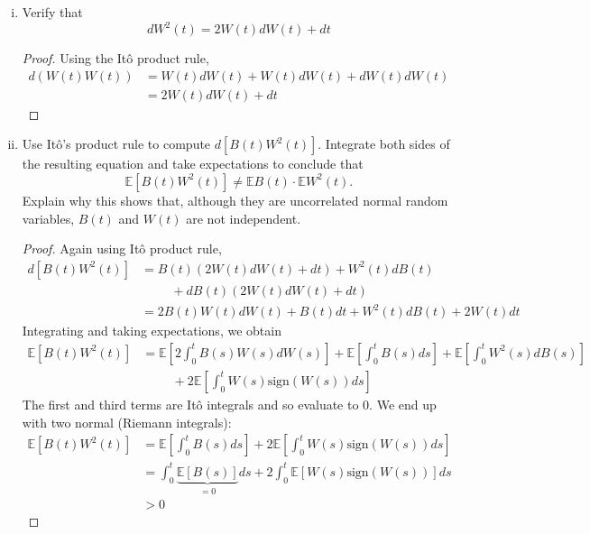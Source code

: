 \documentclass{article}
\newcommand{\E}{\mathbb{E}}
\newcommand{\sign}{\mathrm{sign}}
\theoremstyle{definition}
\theoremstyle{definition}
\begin{document}
\begin{enumerate}
\begin{enumerate}[(i)]
\begin{proof}
        Some notes on the above steps: we were able to set the It\^{0} integral to $0$, as noted, because It\^{o} integrals are martingales. In the final line, we were able to exchange the integral and the expectation using Fubini's theorem, since the integral is finite. 
            
        \end{proof}
        
        
        \item Verify that
        $$dW^2(t) = 2W(t)dW(t)+dt$$
        
        \begin{proof} Using the It\^{o} product rule,
        \begin{align*}
            d(W(t)W(t)) &= W(t)dW(t)+W(t)dW(t)+dW(t)dW(t) \\
            &= 2W(t)dW(t) +dt
        \end{align*}
        \end{proof}
        
        \item Use It\^{o}'s product rule to compute $d\left[ B(t)W^2(t)\right]$. Integrate both sides of the resulting equation and take expectations to conclude that 
        $$ \E[B(t)W^2(t)] \neq \E B(t) \cdot \E W^2(t).$$
        Explain why this shows that, although they are uncorrelated normal random variables, $B(t)$ and $W(t)$ are not independent.
        
        \begin{proof} Again using It\^{o} product rule,
        \begin{align*}
            d[B(t)W^2(t)] &= B(t) (2W(t)dW(t)+dt) + W^2(t)dB(t)\\
            &\hspace{1cm}+ dB(t)(2W(t)dW(t)+dt) \\
            &=2 B(t)W(t)dW(t) + B(t)dt + W^2(t)dB(t) + 2W(t)dt
        \end{align*}
        Integrating and taking expectations, we obtain
        \begin{align*}
            \E[B(t)W^2(t)] &= \E\left[2 \int_0^t B(s)W(s)dW(s) \right] + \E\left[\int_0^t B(s) ds \right] + \E\left[\int_0^t W^2(s)dB(s) \right] \\
            &\hspace{1cm}+ 2\E\left[ \int_0^t W(s)\sign(W(s))ds \right]
        \end{align*}
        The first and third terms are It\^{o} integrals and so evaluate to $0$. We end up with two normal (Riemann integrals):
        \begin{align*}
            \E[B(t)W^2(t)] &= \E\left[\int_0^t B(s)ds \right]+ 2\E\left[\int_0^t W(s)\sign(W(s))ds \right] \\
            &= \int_0^t \underset{=0}{\underbrace{\E\left[B(s)\right]}}ds + 2\int_0^t \E\left[W(s)\sign (W(s))\right]ds\\
            &> 0
        \end{align*}
        

\end{proof}
\end{enumerate}
\end{enumerate}
\end{document}

